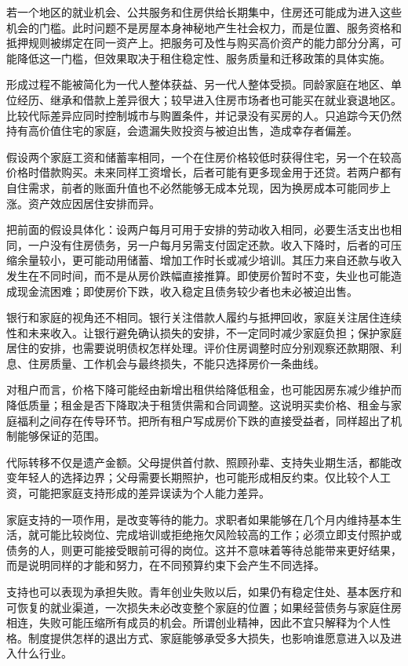 \documentclass[UTF8,fontset=fandol,zihao=-4,oneside,openany]{ctexbook}
\begin{document}
若一个地区的就业机会、公共服务和住房供给长期集中，住房还可能成为进入这些机会的门槛。此时问题不是房屋本身神秘地产生社会权力，而是位置、服务资格和抵押规则被绑定在同一资产上。把服务可及性与购买高价资产的能力部分分离，可能降低这一门槛，但效果取决于租住稳定性、服务质量和迁移政策的具体实施。

形成过程不能被简化为一代人整体获益、另一代人整体受损。同龄家庭在地区、单位经历、继承和借款上差异很大；较早进入住房市场者也可能买在就业衰退地区。比较代际差异应同时控制城市与购置条件，并记录没有买房的人。只追踪今天仍然持有高价值住宅的家庭，会遗漏失败投资与被迫出售，造成幸存者偏差。

假设两个家庭工资和储蓄率相同，一个在住房价格较低时获得住宅，另一个在较高价格时借款购买。未来同样工资增长，后者可能有更多现金用于还贷。若两户都有自住需求，前者的账面升值也不必然能够无成本兑现，因为换房成本可能同步上涨。资产效应因居住安排而异。

\label{arg:P168}
把前面的假设具体化：设两户每月可用于安排的劳动收入相同，必要生活支出也相同，一户没有住房债务，另一户每月另需支付固定还款。收入下降时，后者的可压缩余量较小，更可能动用储蓄、增加工作时长或减少培训。其压力来自还款与收入发生在不同时间，而不是从房价跌幅直接推算。即使房价暂时不变，失业也可能造成现金流困难；即使房价下跌，收入稳定且债务较少者也未必被迫出售。

银行和家庭的视角还不相同。银行关注借款人履约与抵押回收，家庭关注居住连续性和未来收入。让银行避免确认损失的安排，不一定同时减少家庭负担；保护家庭居住的安排，也需要说明债权怎样处理。评价住房调整时应分别观察还款期限、利息、住房质量、工作机会与最终损失，不能只选择房价一条曲线。

对租户而言，价格下降可能经由新增出租供给降低租金，也可能因房东减少维护而降低质量；租金是否下降取决于租赁供需和合同调整。这说明买卖价格、租金与家庭福利之间存在传导环节。把所有租户写成房价下跌的直接受益者，同样超出了机制能够保证的范围。

代际转移不仅是遗产金额。父母提供首付款、照顾孙辈、支持失业期生活，都能改变年轻人的选择边界；父母需要长期照护，也可能形成相反约束。仅比较个人工资，可能把家庭支持形成的差异误读为个人能力差异。

\label{arg:P169}
家庭支持的一项作用，是改变等待的能力。求职者如果能够在几个月内维持基本生活，就可能比较岗位、完成培训或拒绝拖欠风险较高的工作；必须立即支付照护或债务的人，则更可能接受眼前可得的岗位。这并不意味着等待总能带来更好结果，而是说明同样的才能和努力，在不同预算约束下会产生不同选择。

支持也可以表现为承担失败。青年创业失败以后，如果仍有稳定住处、基本医疗和可恢复的就业渠道，一次损失未必改变整个家庭的位置；如果经营债务与家庭住房相连，失败可能压缩所有成员的机会。所谓创业精神，因此不宜只解释为个人性格。制度提供怎样的退出方式、家庭能够承受多大损失，也影响谁愿意进入以及进入什么行业。
\end{document}
